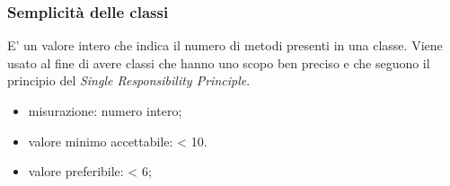 	\subsubsection*{Semplicità delle classi}
	E' un valore intero che indica il numero di metodi presenti in una classe. Viene usato al fine di avere classi che hanno uno scopo ben preciso e che seguono il principio del \textit{Single Responsibility Principle}.
		\begin{itemize}
			\item {misurazione: numero intero;}
			\item {valore minimo accettabile: < 10.}
			\item {valore preferibile: < 6;}
	\end{itemize}